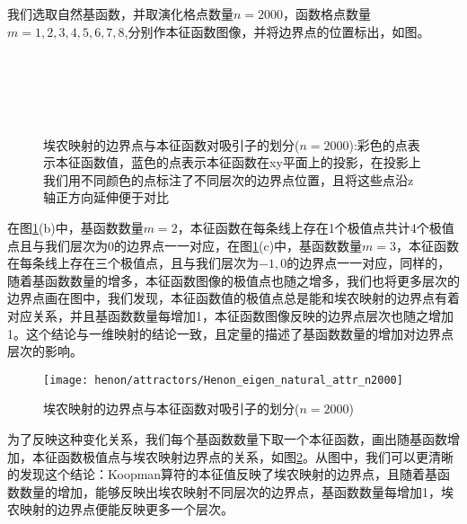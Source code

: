 我们选取自然基函数，并取演化格点数量$n=2000$，函数格点数量$m=1,2,3,4,5,6,7,8$,分别作本征函数图像，并将边界点的位置标出，如图。
\begin{figure}
    \centering
    \\
    \\
    \\
    \\
    \caption[埃农映射的边界点与本征函数对吸引子的划分]{埃农映射的边界点与本征函数对吸引子的划分($n=2000$):彩色的点表示本征函数值，蓝色的点表示本征函数在xy平面上的投影，在投影上我们用不同颜色的点标注了不同层次的边界点位置，且将这些点沿z轴正方向延伸便于对比}\label{fig:Henon_eigen_natural_attr_n2000m8}
\end{figure}
在图\ref{fig:Henon_eigen_natural_attr_n2000m8}(b)中，基函数数量$m=2$，本征函数在每条线上存在1个极值点共计4个极值点且与我们层次为0的边界点一一对应，在图\ref{fig:Henon_eigen_natural_attr_n2000m8}(c)中，基函数数量$m=3$，本征函数在每条线上存在三个极值点，且与我们层次为$-1,0$的边界点一一对应，同样的，随着基函数数量的增多，本征函数图像的极值点也随之增多，我们也将更多层次的边界点画在图中，我们发现，本征函数值的极值点总是能和埃农映射的边界点有着对应关系，并且基函数数量每增加1，本征函数图像反映的边界点层次也随之增加1。这个结论与一维映射的结论一致，且定量的描述了基函数数量的增加对边界点层次的影响。

\begin{figure}
	\centering
	\texttt{[image: henon/attractors/Henon\_eigen\_natural\_attr\_n2000]}
    \caption{埃农映射的边界点与本征函数对吸引子的划分($n=2000$)}\label{fig:Henon_eigen_natural_attr_n2000}
\end{figure}

为了反映这种变化关系，我们每个基函数数量下取一个本征函数，画出随基函数增加，本征函数极值点与埃农映射边界点的关系，如图\ref{fig:Henon_eigen_natural_attr_n2000}。从图中，我们可以更清晰的发现这个结论：Koopman算符的本征值反映了埃农映射的边界点，且随着基函数数量的增加，能够反映出埃农映射不同层次的边界点，基函数数量每增加1，埃农映射的边界点便能反映更多一个层次。

